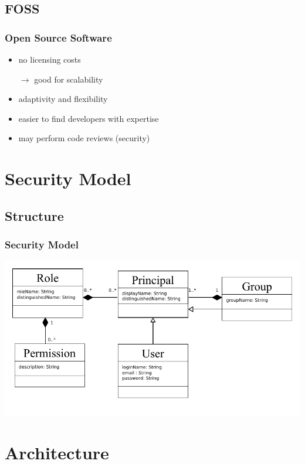 \documentclass{beamer}
\begin{document}
\subsection{FOSS}
\begin{frame}
	\frametitle{Open Source Software}
	\begin{tcolorbox}[title=Why use FOSS components?]
		\begin{itemize}
			\item no licensing costs
			\item[$\rightarrow$] good for scalability
			\item adaptivity and flexibility
			\item easier to find developers with expertise
			\item may perform code reviews (security)
		\end{itemize}
	\end{tcolorbox}
\end{frame}

\section{Security Model}
\subsection{Structure}
\begin{frame}
	\frametitle{Security Model}
	\includegraphics[width=\textwidth]{klassendiagramm.pdf}
\end{frame}

\section{Architecture}
\end{document}
